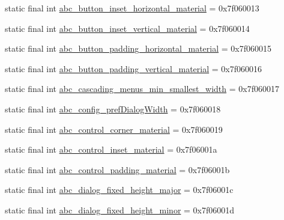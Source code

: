 \begin{DoxyCompactItemize}
\item 
static final int \mbox{\hyperlink{classcom_1_1synnapps_1_1carouselview_1_1_r_1_1dimen_ad2ed0351121d218c4dc7a833ca041e86}{abc\+\_\+button\+\_\+inset\+\_\+horizontal\+\_\+material}} = 0x7f060013
\item 
static final int \mbox{\hyperlink{classcom_1_1synnapps_1_1carouselview_1_1_r_1_1dimen_a63f2171924517b2aed62aba26d9f2b7a}{abc\+\_\+button\+\_\+inset\+\_\+vertical\+\_\+material}} = 0x7f060014
\item 
static final int \mbox{\hyperlink{classcom_1_1synnapps_1_1carouselview_1_1_r_1_1dimen_a5d18d33f30d8f5893498d85798d775e5}{abc\+\_\+button\+\_\+padding\+\_\+horizontal\+\_\+material}} = 0x7f060015
\item 
static final int \mbox{\hyperlink{classcom_1_1synnapps_1_1carouselview_1_1_r_1_1dimen_a5d457814d44ce9c7f75d4498652f9adb}{abc\+\_\+button\+\_\+padding\+\_\+vertical\+\_\+material}} = 0x7f060016
\item 
static final int \mbox{\hyperlink{classcom_1_1synnapps_1_1carouselview_1_1_r_1_1dimen_ac79a3f86a04f86b20c13c0adc74613a0}{abc\+\_\+cascading\+\_\+menus\+\_\+min\+\_\+smallest\+\_\+width}} = 0x7f060017
\item 
static final int \mbox{\hyperlink{classcom_1_1synnapps_1_1carouselview_1_1_r_1_1dimen_a5dcefdce31bdf035920b91fcbddf6c64}{abc\+\_\+config\+\_\+pref\+Dialog\+Width}} = 0x7f060018
\item 
static final int \mbox{\hyperlink{classcom_1_1synnapps_1_1carouselview_1_1_r_1_1dimen_a68db3fc5026cadeba38b62672d12161b}{abc\+\_\+control\+\_\+corner\+\_\+material}} = 0x7f060019
\item 
static final int \mbox{\hyperlink{classcom_1_1synnapps_1_1carouselview_1_1_r_1_1dimen_a7080e1691cadcfbc2f2644d63d28df7d}{abc\+\_\+control\+\_\+inset\+\_\+material}} = 0x7f06001a
\item 
static final int \mbox{\hyperlink{classcom_1_1synnapps_1_1carouselview_1_1_r_1_1dimen_a88315639099568d6f65e51e66e88dfbb}{abc\+\_\+control\+\_\+padding\+\_\+material}} = 0x7f06001b
\item 
static final int \mbox{\hyperlink{classcom_1_1synnapps_1_1carouselview_1_1_r_1_1dimen_ad997025530fc995b46c138187846fe99}{abc\+\_\+dialog\+\_\+fixed\+\_\+height\+\_\+major}} = 0x7f06001c
\item 
static final int \mbox{\hyperlink{classcom_1_1synnapps_1_1carouselview_1_1_r_1_1dimen_af28fcc682dac7a18b4b488d9132ece41}{abc\+\_\+dialog\+\_\+fixed\+\_\+height\+\_\+minor}} = 0x7f06001d
\item 

\end{DoxyCompactItemize}
